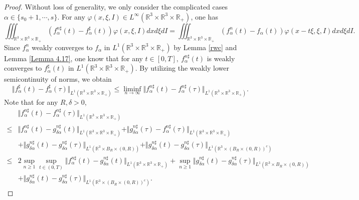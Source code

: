 \documentclass[reqno,11pt]{amsart}
\numberwithin{equation}{section}
\def\R{\mathbb{R}}
\begin{document}
\begin{proof}
	Without loss of generality, we only consider the complicated cases $\alpha \in \{s_0+ 1,\cdots,s\}$. For any $\varphi (x, \xi, I) \in L^\infty (\R^3 \times \R^3 \times \R_+)$, one has
	\begin{equation*}
\iiint_{ \R^3 \times \R^3 \times \R_+} (f^{n\sharp}_\alpha (t) -f^\sharp_\alpha (t))\varphi(x,\xi ,I) dxd\xi dI= \iiint_{ \R^3 \times \R^3 \times \R_+} (f^n_\alpha (t)-f_\alpha (t)) \varphi (x-t\xi ,\xi ,I) dxd\xi dI.
	\end{equation*}
Since $f^n_\alpha$ weakly converges to $f_\alpha$ in $L^1 (\R^3 \times \R^3 \times \R_+)$ by Lemma \ref{rwc} and Lemma \ref{Lemma 4.17}, one know that for any $t \in [0,T],\ f^{n\sharp}_\alpha (t)$ is weakly converges to $f^\sharp_\alpha (t)$ in $L^1(\R^3 \times \R^3 \times \R_+)$. By utilizing the weakly lower semicontinuity of norms, we obtain
	\begin{equation*}
		\Vert f^{\sharp }_\alpha (t)- f^{\sharp }_\alpha (\tau) \Vert_{L^1(\R^3 \times \R^3 \times \R_+)} 
		\leq  \liminf \limits_{n\rightarrow \infty} \Vert f^{n\sharp }_\alpha (t)- f^{n\sharp }_\alpha (\tau) \Vert_{L^1(\R^3 \times \R^3 \times \R_+)} .
	\end{equation*}
Note that for any $R, \delta > 0$,
\begin{equation*}
		\begin{aligned}
			&\Vert f^{n\sharp }_\alpha (t)- f^{n\sharp }_\alpha (\tau) \Vert_{L^1(\R^3 \times \R^3 \times \R_+)} \\
		\leq & \Vert f^{n\sharp }_\alpha (t)- g^{n\sharp }_{\delta \alpha } (t) \Vert_{L^1(\R^3 \times \R^3 \times \R_+)} + \Vert g^{n\sharp }_{\delta \alpha } (\tau)- f^{n\sharp }_\alpha (\tau) \Vert_{L^1(\R^3 \times \R^3 \times \R_+)} \\
& + \Vert g^{n\sharp }_{\delta \alpha } (t)- g^{n\sharp }_{\delta \alpha } (\tau) \Vert_{L^1(\R^3 \times B_R \times (0, R) )} + \Vert g^{n\sharp }_{\delta \alpha } (t)- g^{n\sharp }_{\delta \alpha } (\tau) \Vert_{L^1(\R^3 \times ( B_R \times (0, R) )^c )} \\
		\leq & 2 \sup_{n \geq 1} \sup \limits_{t\in (0,T)} \Vert f^{n\sharp }_\alpha (t)- g^{n\sharp }_{\delta \alpha } (t) \Vert_{L^1(\R^3 \times \R^3 \times \R_+)} + \sup_{n \geq 1} \Vert g^{n\sharp }_{\delta \alpha } (t)- g^{n\sharp }_{\delta \alpha } (\tau) \Vert_{L^1(\R^3 \times B_R \times (0, R) )} \\
		& + \Vert g^{n\sharp }_{\delta \alpha } (t)- g^{n\sharp }_{\delta \alpha } (\tau) \Vert_{L^1(\R^3 \times ( B_R \times (0, R) )^c )} .

\end{aligned}
\end{equation*}
\end{proof}
\end{document}
